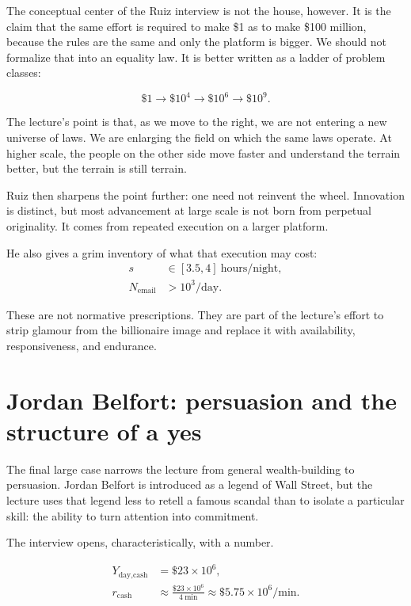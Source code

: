 The conceptual center of the Ruiz interview is not the house, however. It is the claim that the same effort is required to make \$1 as to make \$100 million, because the rules are the same and only the platform is bigger. We should not formalize that into an equality law. It is better written as a ladder of problem classes:

\begin{equation}
\$1 \longrightarrow \$10^4 \longrightarrow \$10^6 \longrightarrow \$10^9.
\end{equation}

The lecture's point is that, as we move to the right, we are not entering a new universe of laws. We are enlarging the field on which the same laws operate. At higher scale, the people on the other side move faster and understand the terrain better, but the terrain is still terrain.

Ruiz then sharpens the point further: one need not reinvent the wheel. Innovation is distinct, but most advancement at large scale is not born from perpetual originality. It comes from repeated execution on a larger platform.

He also gives a grim inventory of what that execution may cost:
\begin{align}
s &\in [3.5,4]\ \text{hours/night},\\
N_{\text{email}} &> 10^3/\text{day}.
\end{align}

These are not normative prescriptions. They are part of the lecture's effort to strip glamour from the billionaire image and replace it with availability, responsiveness, and endurance.

\section{Jordan Belfort: persuasion and the structure of a yes}

The final large case narrows the lecture from general wealth-building to persuasion. Jordan Belfort is introduced as a legend of Wall Street, but the lecture uses that legend less to retell a famous scandal than to isolate a particular skill: the ability to turn attention into commitment.

The interview opens, characteristically, with a number.

\begin{align}
Y_{\text{day,cash}} &= \$23 \times 10^6,\\
r_{\text{cash}} &\approx \frac{\$23 \times 10^6}{4\ \text{min}} \approx \$5.75 \times 10^6/\text{min}.
\end{align}

